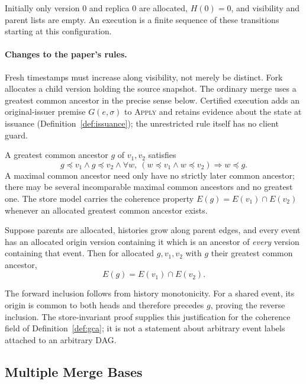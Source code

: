 \begin{definition}
Initially only version $0$ and replica $0$ are allocated, $H(0)=0$, and
visibility and parent lists are empty. An execution is a finite sequence of
these transitions starting at this configuration.
\end{definition}
\paragraph{Changes to the paper's rules.}
Fresh timestamps must increase along visibility, not merely be distinct.
Fork allocates a child version holding the source snapshot. The ordinary merge
uses a greatest common ancestor in the precise sense below. Certified execution
adds an original-issuer premise $G(e,\sigma)$ to \textsc{Apply} and retains
evidence about the state at issuance (Definition~\ref{def:issuance}); the
unrestricted rule itself has no client guard.

\begin{definition}
\label{def:gca}
A greatest common ancestor $g$ of $v_1,v_2$ satisfies
\[
 g\preceq v_1\land g\preceq v_2\land
 \forall w,\ (w\preceq v_1\land w\preceq v_2)\Longrightarrow w\preceq g.
\]
A maximal common ancestor need only have no strictly later common ancestor;
there may be several incomparable maximal common ancestors and no greatest one.
The store model carries the coherence property
$E(g)=E(v_1)\cap E(v_2)$ whenever an allocated greatest common ancestor exists.
\end{definition}

\begin{theorem}
\label{thm:gca-intersection}
Suppose parents are allocated, histories grow along parent edges, and every
event has an allocated origin version containing it which is an ancestor of
\emph{every} version containing that event. Then for allocated $g,v_1,v_2$
with $g$ their greatest common ancestor,
\[
 E(g)=E(v_1)\cap E(v_2).
\]
\end{theorem}
The forward inclusion follows from history monotonicity. For a shared event,
its origin is common to both heads and therefore precedes $g$, proving the
reverse inclusion. The store-invariant proof supplies this justification for
the coherence field of Definition~\ref{def:gca}; it is not a statement about
arbitrary event labels attached to an arbitrary DAG.

\subsection{Multiple Merge Bases}

